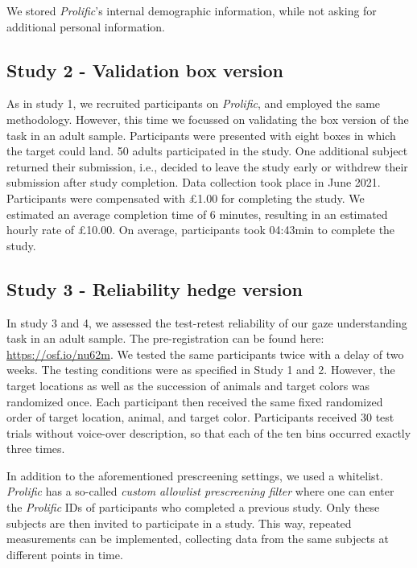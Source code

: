 \documentclass[
  man,floatsintext]{apa6}
\begin{document}
We stored \emph{Prolific}'s internal demographic information, while not asking for additional personal information.

\hypertarget{study-2---validation-box-version}{%
\subsection{Study 2 - Validation box version}\label{study-2---validation-box-version}}

As in study 1, we recruited participants on \emph{Prolific}, and employed the same methodology.
However, this time we focussed on validating the box version of the task in an adult sample.
Participants were presented with eight boxes in which the target could land.
50 adults participated in the study.
One additional subject returned their submission, i.e., decided to leave the study early or withdrew their submission after study completion.
Data collection took place in June 2021.
Participants were compensated with £1.00 for completing the study.
We estimated an average completion time of 6 minutes, resulting in an estimated hourly rate of £10.00.
On average, participants took 04:43min to complete the study.

\hypertarget{study-3---reliability-hedge-version}{%
\subsection{Study 3 - Reliability hedge version}\label{study-3---reliability-hedge-version}}

In study 3 and 4, we assessed the test-retest reliability of our gaze understanding task in an adult sample.
The pre-registration can be found here: \url{https://osf.io/nu62m}.
We tested the same participants twice with a delay of two weeks.
The testing conditions were as specified in Study 1 and 2.
However, the target locations as well as the succession of animals and target colors was randomized once.
Each participant then received the same fixed randomized order of target location, animal, and target color.
Participants received 30 test trials without voice-over description, so that each of the ten bins occurred exactly three times.

In addition to the aforementioned prescreening settings, we used a whitelist.
\emph{Prolific} has a so-called \emph{custom allowlist prescreening filter} where one can enter the \emph{Prolific} IDs of participants who completed a previous study.
Only these subjects are then invited to participate in a study.
This way, repeated measurements can be implemented, collecting data from the same subjects at different points in time.
\end{document}
